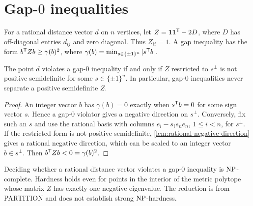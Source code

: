 \section{Gap-\texorpdfstring{$0$}{0} inequalities}
\label{sec:gap-zero}

For a rational distance vector $d$ on $n$ vertices, let
$Z=\mathbf 1\mathbf 1^{\mathsf T}-2D$, where $D$ has off-diagonal entries $d_{ij}$ and
zero diagonal. Thus $Z_{ii}=1$. A gap inequality has the form
$b^{\mathsf T} Zb\ge\gamma(b)^2$, where
$\gamma(b)=\min_{s\in\{\pm1\}^n}|s^{\mathsf T} b|$.

\begin{lemma}\label{lem:gap-zero-hyperplanes}
The point $d$ violates a gap-$0$ inequality if and only if
$Z$ restricted to $s^\perp$ is not positive semidefinite for some
$s\in\{\pm1\}^n$. In particular, gap-$0$ inequalities never separate
a positive semidefinite $Z$.
\end{lemma}

\begin{proof}
An integer vector $b$ has $\gamma(b)=0$ exactly when $s^{\mathsf T} b=0$ for
some sign vector $s$. Hence a gap-$0$ violator gives a negative
direction on $s^\perp$. Conversely, fix such an $s$ and use the rational
basis with columns $e_i-s_is_ne_n$, $1\le i<n$, for $s^\perp$.
If the restricted form is not positive semidefinite,
\cref{lem:rational-negative-direction} gives a rational negative
direction, which can be scaled to an integer vector $b\in s^\perp$.
Then $b^{\mathsf T} Zb<0=\gamma(b)^2$.
\end{proof}

\begin{theorem}\label{thm:gap-zero-hardness}
Deciding whether a rational distance vector violates a gap-$0$ inequality is
$\mathrm{NP}$-complete. Hardness holds even for points in the interior of the
metric polytope whose matrix $Z$ has exactly one negative eigenvalue.
The reduction is from PARTITION and does not establish strong
$\mathrm{NP}$-hardness.
\end{theorem}

